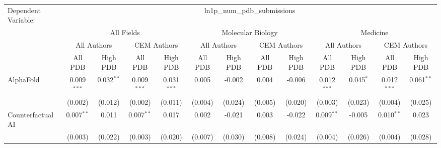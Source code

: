 \begingroup
\centering
\begin{tabular}{lcccccccccccc}
   \tabularnewline \midrule \midrule
   Dependent Variable: & \multicolumn{12}{c}{ln1p\_num\_pdb\_submissions}\\
 & \multicolumn{4}{c}{All Fields} & \multicolumn{4}{c}{Molecular Biology} & \multicolumn{4}{c}{Medicine} \\
\cmidrule(lr){2-5} \cmidrule(lr){6-9} \cmidrule(lr){10-13}
 & \multicolumn{2}{c}{All Authors} & \multicolumn{2}{c}{CEM Authors} & \multicolumn{2}{c}{All Authors} & \multicolumn{2}{c}{CEM Authors} & \multicolumn{2}{c}{All Authors} & \multicolumn{2}{c}{CEM Authors} \\
\cmidrule(lr){2-3} \cmidrule(lr){4-5} \cmidrule(lr){6-7} \cmidrule(lr){8-9} \cmidrule(lr){10-11} \cmidrule(lr){12-13}
 & \multicolumn{1}{c}{All PDB} & \multicolumn{1}{c}{High PDB} & \multicolumn{1}{c}{All PDB} & \multicolumn{1}{c}{High PDB} & \multicolumn{1}{c}{All PDB} & \multicolumn{1}{c}{High PDB} & \multicolumn{1}{c}{All PDB} & \multicolumn{1}{c}{High PDB} & \multicolumn{1}{c}{All PDB} & \multicolumn{1}{c}{High PDB} & \multicolumn{1}{c}{All PDB} & \multicolumn{1}{c}{High PDB} \\
\cmidrule(lr){2-2} \cmidrule(lr){3-3} \cmidrule(lr){4-4} \cmidrule(lr){5-5} \cmidrule(lr){6-6} \cmidrule(lr){7-7} \cmidrule(lr){8-8} \cmidrule(lr){9-9} \cmidrule(lr){10-10} \cmidrule(lr){11-11} \cmidrule(lr){12-12} \cmidrule(lr){13-13}
   AlphaFold                                                  & 0.009$^{***}$  & 0.032$^{**}$   & 0.009$^{***}$ & 0.031$^{***}$  & 0.005         & -0.002        & 0.004         & -0.006         & 0.012$^{***}$ & 0.045$^{*}$ & 0.012$^{***}$ & 0.061$^{**}$\\   
                                                              & (0.002)        & (0.012)        & (0.002)       & (0.011)        & (0.004)       & (0.024)       & (0.005)       & (0.020)        & (0.003)       & (0.023)     & (0.004)       & (0.025)\\   
   Counterfactual AI                                          & 0.007$^{**}$   & 0.011          & 0.007$^{**}$  & 0.017          & 0.002         & -0.021        & 0.003         & -0.022         & 0.009$^{**}$  & -0.005      & 0.010$^{**}$  & 0.023\\   
                                                              & (0.003)        & (0.022)        & (0.003)       & (0.020)        & (0.007)       & (0.030)       & (0.008)       & (0.024)        & (0.004)       & (0.026)     & (0.004)       & (0.028)\\   

\end{tabular}
